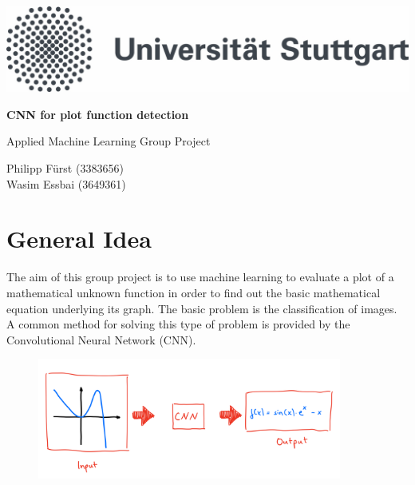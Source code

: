 \documentclass[11pt,a4paper]{scrartcl}
\begin{document}
\lstset{language=tex}
  \pagestyle{empty}

  \begin{titlepage}
    
    \center
    \includegraphics[scale=0.3]{unistuttgart_logo_de} 
    \vspace*{2cm} 

 \begin{center} \large 
        
    \vspace*{2cm}

    {\huge \textbf{CNN for plot function detection}}
    \vspace*{2.5cm}

    Applied Machine Learning Group Project
    \vspace*{2.5cm}

    Philipp Fürst (3383656)\\
    Wasim Essbai (3649361)
    \vspace*{1cm}

  \end{center}
\end{titlepage}

  \tableofcontents
  
\newpage

  \pagestyle{plain}
  
  
\section{General Idea}
The aim of this group project is to use machine learning to evaluate a plot of a mathematical unknown function in order to find out the basic mathematical equation underlying its graph.
The basic problem is the classification of images. A common method for solving this type of problem is provided by the Convolutional Neural Network (CNN). 
\begin{figure}[h!]
	\centering
	\includegraphics[width=10cm]{general_idea}
	\label{img:general_idea}
\end{figure}
\end{document}
